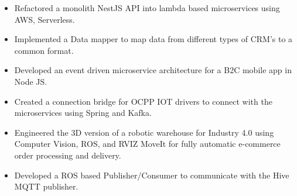 \documentclass[10pt,a4paper,ragged2e]{packages/altacv}
\begin{document}

\begin{fullwidth}
\makecvheader
\end{fullwidth}




\begin{itemize}
\item Refactored a monolith NestJS API into lambda based microservices using AWS, Serverless.
\item Implemented a Data mapper to map data from different types of CRM's to a common format.
\end{itemize}

\divider

\begin{itemize}
\item Developed an event driven microservice architecture for a B2C mobile app in Node JS.
\item Created a connection bridge for OCPP IOT drivers to connect with the microservices using Spring and Kafka.
\end{itemize}

\divider

\begin{itemize}
\item Engineered the 3D version of a robotic warehouse for Industry 4.0 using Computer Vision, ROS, and RVIZ
MoveIt for fully automatic e-commerce order processing and delivery.
\smallskip
\item Developed a ROS based Publisher/Consumer to communicate with the Hive MQTT publisher.
\end{itemize}


\end{document}
